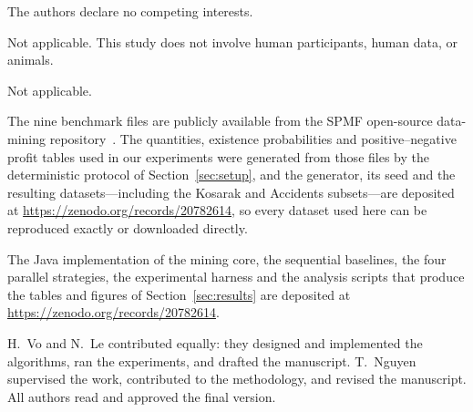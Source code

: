 \documentclass[pdflatex,sn-vancouver-num]{sn-jnl}
\theoremstyle{thmstyleone}%
\theoremstyle{thmstyletwo}%
\theoremstyle{thmstylethree}%
\begin{document}
The authors declare no competing interests.

Not applicable. This study does not involve human participants, human data, or
animals.

Not applicable.

The nine benchmark files are publicly available from the SPMF
open-source data-mining repository~\cite{fournierviger2014spmf}. The
quantities, existence probabilities and positive--negative profit tables
used in our experiments were generated from those files by the
deterministic protocol of Section~\ref{sec:setup}, and the generator, its
seed and the resulting datasets---including the Kosarak and Accidents
subsets---are deposited at \url{https://zenodo.org/records/20782614}, so
every dataset used here can be reproduced exactly or downloaded directly.
 
The Java implementation of the mining core, the sequential baselines, the
four parallel strategies, the experimental harness and the analysis
scripts that produce the tables and figures of
Section~\ref{sec:results} are deposited at
\url{https://zenodo.org/records/20782614}.

H.~Vo and N.~Le contributed equally: they designed and implemented the
algorithms, ran the experiments, and drafted the manuscript. T.~Nguyen
supervised the work, contributed to the methodology, and revised the manuscript.
All authors read and approved the final version.
\end{document}
